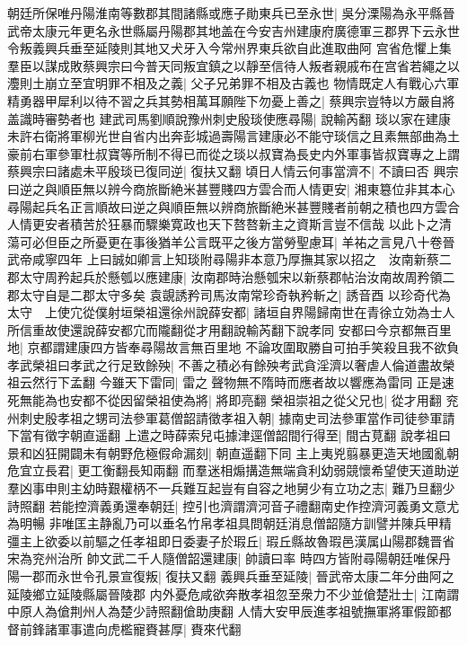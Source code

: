 朝廷所保唯丹陽淮南等數郡其間諸縣或應子勛東兵已至永世|{
	吳分溧陽為永平縣晉武帝太康元年更名永世縣屬丹陽郡其地盖在今安吉州建康府廣德軍三郡界下云永世令叛義興兵垂至延陵則其地又犬牙入今常州界東兵欲自此進取曲阿}
宫省危懼上集羣臣以謀成敗蔡興宗曰今普天同叛宜鎮之以靜至信待人叛者親戚布在宫省若繩之以灋則土崩立至宜明罪不相及之義|{
	父子兄弟罪不相及古義也}
物情既定人有戰心六軍精勇器甲犀利以待不習之兵其勢相萬耳願陛下勿憂上善之|{
	蔡興宗豈特以方嚴自將盖識時審勢者也}
建武司馬劉順說豫州刺史殷琰使應尋陽|{
	說輸芮翻}
琰以家在建康未許右衛將軍柳光世自省内出奔彭城過壽陽言建康必不能守琰信之且素無部曲為土豪前右軍參軍杜叔寶等所制不得已而從之琰以叔寶為長史内外軍事皆叔寶專之上謂蔡興宗曰諸處未平殷琰已復同逆|{
	復扶又翻}
頃日人情云何事當濟不|{
	不讀曰否}
興宗曰逆之與順臣無以辨今商旅斷絶米甚豐賤四方雲合而人情更安|{
	湘東簒位非其本心尋陽起兵名正言順故曰逆之與順臣無以辨商旅斷絶米甚豐賤者前朝之積也四方雲合人情更安者積苦於狂暴而驟樂寛政也天下嗸嗸新主之資斯言豈不信哉}
以此卜之清蕩可必但臣之所憂更在事後猶羊公言既平之後方當勞聖慮耳|{
	羊祐之言見八十卷晉武帝咸寧四年}
上曰誠如卿言上知琰附尋陽非本意乃厚撫其家以招之　汝南新蔡二郡太守周矜起兵於懸瓠以應建康|{
	汝南郡時治懸瓠宋以新蔡郡帖治汝南故周矜領二郡太守自是二郡太守多矣}
袁覬誘矜司馬汝南常珍奇執矜斬之|{
	誘音酉}
以珍奇代為太守　上使宂從僕射垣榮祖還徐州說薛安都|{
	諸垣自界陽歸南世在青徐立効為士人所信重故使還說薛安都宂而隴翻從才用翻說輸芮翻下說孝同}
安都曰今京都無百里地|{
	京都謂建康四方皆奉尋陽故言無百里地}
不論攻圍取勝自可拍手笑殺且我不欲負孝武榮祖曰孝武之行足致餘殃|{
	不善之積必有餘殃考武貪淫濟以奢虐人倫道盡故榮祖云然行下孟翻}
今雖天下雷同|{
	雷之聲物無不隋時而應者故以響應為雷同}
正是速死無能為也安都不從因留榮祖使為將|{
	將即亮翻}
榮祖崇祖之從父兄也|{
	從才用翻}
兖州刺史殷孝祖之甥司法參軍葛僧韶請徵孝祖入朝|{
	據南史司法參軍當作司徒參軍請下當有徵字朝直遥翻}
上遣之時薛索兒屯據津逕僧韶間行得至|{
	間古莧翻}
說孝祖曰景和凶狂開闢未有朝野危極假命漏刻|{
	朝直遥翻下同}
主上夷兇翦暴更造天地國亂朝危宜立長君|{
	更工衡翻長知兩翻}
而羣迷相煽搆造無端貪利幼弱競懷希望使天道助逆羣凶事申則主幼時艱權柄不一兵難互起豈有自容之地舅少有立功之志|{
	難乃旦翻少詩照翻}
若能控濟義勇還奉朝廷|{
	控引也濟謂濟河音子禮翻南史作控濟河義勇文意尤為明暢}
非唯匡主静亂乃可以垂名竹帛孝祖具問朝廷消息僧韶隨方訓譬并陳兵甲精彊主上欲委以前驅之任孝祖即日委妻子於瑕丘|{
	瑕丘縣故魯瑕邑漢属山陽郡魏晋省宋為兖州治所}
帥文武二千人隨僧韶還建康|{
	帥讀曰率}
時四方皆附尋陽朝廷唯保丹陽一郡而永世令孔景宣復叛|{
	復扶又翻}
義興兵垂至延陵|{
	晉武帝太康二年分曲阿之延陵鄉立延陵縣屬晉陵郡}
内外憂危咸欲奔散孝祖忽至衆力不少並傖楚壯士|{
	江南謂中原人為傖荆州人為楚少詩照翻傖助庚翻}
人情大安甲辰進孝祖號撫軍將軍假節都督前鋒諸軍事遣向虎檻寵賚甚厚|{
	賚來代翻}
